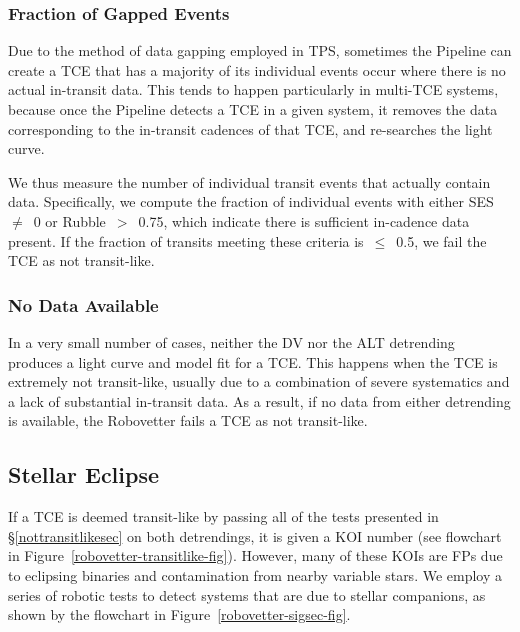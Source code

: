 \subsubsection{Fraction of Gapped Events}
\label{s:rocky}

Due to the method of data gapping employed in TPS, sometimes the \kepler{} Pipeline can create a TCE that has a majority of its individual events occur where there is no actual in-transit data. This tends to happen particularly in multi-TCE systems, because once the \kepler{} Pipeline detects a TCE in a given system, it removes the data corresponding to the in-transit cadences of that TCE, and re-searches the light curve. 

We thus measure the number of individual transit events that actually contain data. Specifically, we compute the fraction of individual events with either SES~$\ne$~0 or Rubble~$>$~0.75, which indicate there is sufficient in-cadence data present. If the fraction of transits meeting these criteria is~$\le$~0.5, we fail the TCE as not transit-like.


\subsubsection{No Data Available}
\label{s:nofits}

In a very small number of cases, neither the DV nor the ALT detrending produces a light curve and model fit for a TCE. This happens when the TCE is extremely not transit-like, usually due to a combination of severe systematics and a lack of substantial in-transit data. As a result, if no data from either detrending is available, the Robovetter fails a TCE as not transit-like.


\subsection{Stellar Eclipse}
\label{sigsecsec}

If a TCE is deemed transit-like by passing all of the tests presented in \S\ref{nottransitlikesec} on both detrendings, it is given a KOI number (see flowchart in Figure~\ref{robovetter-transitlike-fig}).
However, many of these KOIs are FPs due to eclipsing binaries and contamination from nearby variable stars. We employ a series of robotic tests to detect systems that are due to stellar companions, as shown by the flowchart in Figure~\ref{robovetter-sigsec-fig}.



